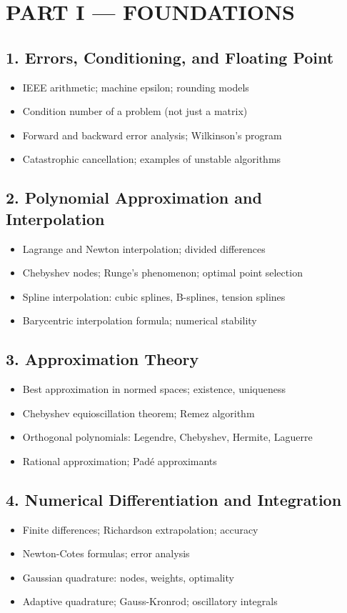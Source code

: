 \section{PART I --- FOUNDATIONS}

\subsection{1. Errors, Conditioning, and Floating Point}
\begin{itemize}
\item IEEE arithmetic; machine epsilon; rounding models
\item Condition number of a problem (not just a matrix)
\item Forward and backward error analysis; Wilkinson's program
\item Catastrophic cancellation; examples of unstable algorithms
\end{itemize}

\subsection{2. Polynomial Approximation and Interpolation}
\begin{itemize}
\item Lagrange and Newton interpolation; divided differences
\item Chebyshev nodes; Runge's phenomenon; optimal point selection
\item Spline interpolation: cubic splines, B-splines, tension splines
\item Barycentric interpolation formula; numerical stability
\end{itemize}

\subsection{3. Approximation Theory}
\begin{itemize}
\item Best approximation in normed spaces; existence, uniqueness
\item Chebyshev equioscillation theorem; Remez algorithm
\item Orthogonal polynomials: Legendre, Chebyshev, Hermite, Laguerre
\item Rational approximation; Pad\'e approximants
\end{itemize}

\subsection{4. Numerical Differentiation and Integration}
\begin{itemize}
\item Finite differences; Richardson extrapolation; accuracy
\item Newton-Cotes formulas; error analysis
\item Gaussian quadrature: nodes, weights, optimality
\item Adaptive quadrature; Gauss-Kronrod; oscillatory integrals
\end{itemize}

